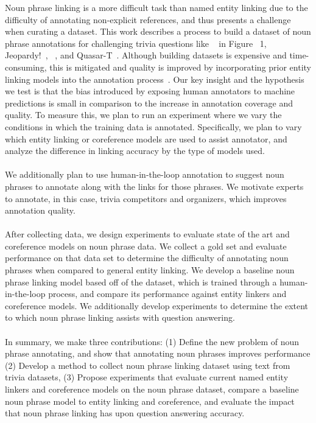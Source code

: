 Noun phrase linking is a more difficult task than named entity linking due to the difficulty of annotating non-explicit references, and thus presents a challenge when curating a dataset. 
This work describes a process to build a dataset of noun phrase annotations for challenging trivia questions like \qb{}~\citep{qb19} in Figure~ 1, Jeopardy!~\citep{dunn2017searchqa}, \triviaqa{}~\citep{joshi2017trivia}, and Quasar-T~\citep{dhingra2017quasar}.
Although building datasets is expensive and time-consuming, this is mitigated and quality is improved by incorporating prior entity linking models into the annotation process~\citep{wallace2018trick,dua2019drop,dasigi2019quoref,nie2019adversarial}.
Our key insight and the hypothesis we test is that the bias introduced by exposing human annotators to machine predictions is small in comparison to the increase in annotation coverage and quality.
To measure this, we plan to run an experiment where we vary the conditions in which the training data is annotated.
Specifically, we plan to vary which entity linking or coreference models are used to assist annotator, and analyze the difference in linking accuracy by the type of models used. 
\\
\\
We additionally plan to use human-in-the-loop annotation to suggest noun phrases to annotate along with the links for those phrases.
We motivate experts to annotate, in this case, trivia competitors and organizers, which improves annotation quality.
\\
\\
After collecting data, we design experiments to evaluate state of the art \nel{} and coreference models on noun phrase data. 
We collect a gold set and evaluate performance on that data set to determine the difficulty of annotating noun phrases when compared to general entity linking.
We develop a baseline noun phrase linking model based off of the dataset, which is trained through a human-in-the-loop process, and compare its performance against entity linkers and coreference models. 
We additionally develop experiments to determine the extent to which noun phrase linking assists with question answering. 
\\
\\
In summary, we make three contributions: (1) Define the new problem of noun phrase annotating, and show that annotating noun phrases improves \qa{} performance (2) Develop a method to collect noun phrase linking dataset using text from trivia datasets, (3) Propose experiments that evaluate current named entity linkers and coreference models on the noun phrase dataset, compare a baseline noun phrase model to entity linking and coreference, and evaluate the impact that noun phrase linking has upon question answering accuracy.
